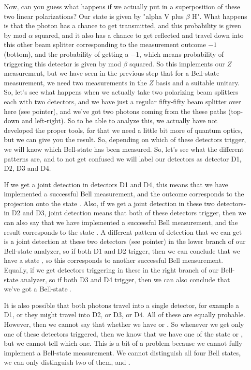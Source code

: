 Now, can you guess what happens if we actually put in a superposition of these two linear polarizations? Our state is given by "alpha V plus $\beta$ H". What happens is that the photon has a chance to get transmitted, and this probability is given by mod $\alpha$ squared, and it also has a chance to get reflected and travel down into this other beam splitter corresponding to the measurement outcome  $-1$ (bottom), and the probability of getting a  $-1$, which means probability of triggering this detector is given by mod $\beta$ squared. So this implements our $Z$ measurement, but we have seen in the previous step that for a Bell-state measurement, we need two measurements in the $Z$ basis and a suitable unitary. So, let's see what happens when we actually take two polarizing beam splitters each with two detectors, and we have just a regular fifty-fifty beam splitter over here (see pointer), and we've got two photons coming from the these paths (top-down and left-right). So to be able to analyze this, we actually have not developed the proper tools, for that we need a little bit more of quantum optics, but we can give you the result. So, depending on which of these detectors trigger, we will know which Bell-state has been measured. So, let's see what the different patterns are, and to not get confused we will label our detectors as detector D1, D2, D3 and D4.

If we get a joint detection in detectors D1 and D4, this means that we have implemented a successful Bell measurement, and the outcome corresponds to the projection onto the state \ket{\Psi^-}. Also, if we get a joint detection in these two detectors- in D2 and D3, joint detection means that both of these detectors trigger, then we can also say that we have implemented a successful Bell measurement, and the result corresponds to the state \ket{\Psi^-}. A different pattern of detection that we can get is a joint detection at these two detectors (see pointer) in the lower branch of our Bell-state analyzer, so if both D1 and D2 trigger, then we can conclude that we have a state \ket{\Psi^+}, so this corresponds to another successful Bell measurement. Equally, if we get detectors triggering in these in the right branch of our Bell-state analyzer, so if both D3 and D4 trigger, then we can also conclude that we've got a Bell-state \ket{\Psi^+}.

It is also possible that both photons travel into a single detector, for example a D1, or they might travel into D2, or D3, or D4. All of these are equally probable. However, then we cannot say that whether we have \ket{\Phi^+} or \ket{\Phi^-}. So whenever we get only one of these detectors triggered, then we know that we have one of the state \ket{\Psi^+} or \ket{\Psi^-}, but we cannot tell which one. This is a bit of a problem because we cannot fully implement a Bell-state measurement. We cannot distinguish all four Bell states, we can only distinguish two of them, \ket{\Psi^+} and \ket{\Psi^-}.

